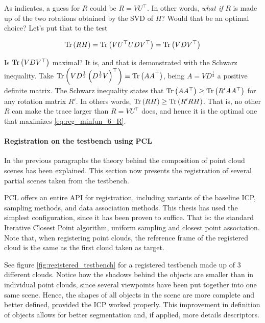 \documentclass[../main.tex]{subfiles}
\begin{document}
As \cite{least_squares_3D_point_sets_Arun} indicates, a guess for $R$ could be $R=VU^{\top}$. In other words, \emph{what if} $R$ is made up of the two rotations obtained by the SVD of $H$? Would that be an optimal choice? Let's put that to the test

\begin{equation} \label{eq:tr_RH}
    \operatorname{Tr} \left(RH\right) = \operatorname{Tr} \left(VU^{\top}UDV^{\top}\right) = \operatorname{Tr} \left(VDV^{\top}\right)
\end{equation}

Is $\operatorname{Tr} \left(VDV^{\top}\right)$ maximal? It is, and that is demonstrated with the Schwarz inequality. Take $\operatorname{Tr} \left(VD^{\frac{1}{2}}\left(D^{\frac{1}{2}}V\right)^{\top}\right) \equiv \operatorname{Tr}\left(AA^{\top}\right)$, being $A=VD^{\frac{1}{2}}$ a positive definite matrix. The Schwarz inequality states that $\operatorname{Tr}\left(AA^{\top}\right) \geq \operatorname{Tr}\left(R'AA^{\top}\right)$ for any rotation matrix $R'$. In others words, $\operatorname{Tr}\left(RH\right) \geq \operatorname{Tr}\left(R'RH\right)$. That is, no other $R$ can make the trace larger than $R=VU^{\top}$ does, and hence it is the optimal one that maximizes \ref{eq:reg_minfun_6_R}.



\paragraph{Registration on the testbench using PCL} 
In the previous paragraphs the theory behind the composition of point cloud scenes has been explained. This section now presents the registration of several partial scenes taken from the testbench. 

PCL offers an entire API for registration, including variants of the baseline ICP, sampling methods, and data association methods. This thesis has used the simplest configuration, since it has been proven to suffice. That is: the standard Iterative Closest Point algorithm, uniform sampling and closest point association. Note that, when registering point clouds, the reference frame of the registered cloud is the same as the first cloud taken as target. 

See figure \ref{fig:registered_testbench} for a registered testbench made up of 3 different clouds. Notice how the shadows behind the objects are smaller than in individual point clouds, since several viewpoints have been put together into one same scene. Hence, the shapes of all objects in the scene are more complete and better defined, provided the ICP worked properly. This improvement in definition of objects allows for better segmentation and, if applied, more details descriptors.
\end{document}
